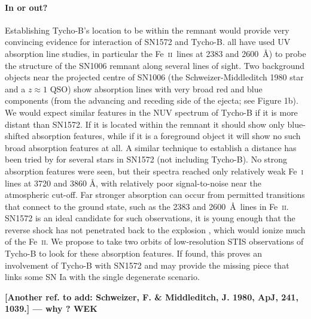 \documentclass[12pt]{article}
\newcommand{\feii}{Fe~\textsc{ii}}
\begin{document}
\paragraph{In or out?}
Establishing Tycho-B's location to be within the remnant would provide very convincing evidence for interaction of SN1572 and Tycho-B. 
\cite{1988ApJ...327..164F,1993ApJ...416..247W, 2005ApJ...624..189W} all have used UV absorption line studies, in particular the \feii\ lines at 2383 and 2600~\AA) to probe the structure of the SN1006 remnant along several lines of sight. Two background objects near the projected centre of SN1006  (the Schweizer-Middleditch 1980 star and a $z \approx 1$ QSO) show absorption lines with very broad red and blue components (from the advancing and receding side of the ejecta; see Figure 1b).  We would expect similar features in the NUV spectrum of Tycho-B if it is more distant than SN1572.   If it is located  within the remnant it should  show only blue-shifted absorption features, while if it is a foreground object it will show no such broad absorption features at all. A similar technique to establish a distance has been tried by \citet{2007PASJ...59..811I} for  several stars in SN1572 (not including Tycho-B).  No strong absorption features were seen, but their spectra reached only relatively weak Fe~\textsc{i} lines at 3720 and 3860 \AA, with relatively poor signal-to-noise near the atmospheric cut-off.  
 Far stronger absorption can occur  from permitted transitions that connect to the ground state, such as the 2383 and 2600~\AA\ lines in \feii.  
SN1572 is an ideal candidate for such observations, it is young enough that the reverse shock has not penetrated back to the explosion \citep[current radius 183\arcsec;][]{2005ApJ...634..376W}, which would  ionize much of the \feii. We propose to take two orbits of low-resolution STIS observations of Tycho-B to look for these absorption features. If found,  this proves an involvement of Tycho-B with SN1572 and may provide the missing piece that links some SN Ia with the single degenerate scenario.

{\bf[Another ref. to add:  Schweizer, F. \& Middleditch, J. 1980, ApJ, 241, 1039.] --- why ? WEK}
\end{document}
